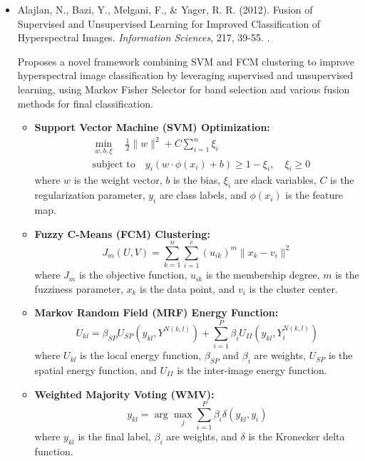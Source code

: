 \documentclass[10pt,svgnames,fragile]{beamer}
\begin{document}
\begin{frame}{}
\tiny
\begin{itemize}

    \item Alajlan, N., Bazi, Y., Melgani, F., \& Yager, R. R. (2012). Fusion of Supervised and Unsupervised Learning for Improved Classification of Hyperspectral Images. \textit{Information Sciences}, 217, 39-55. \href{https://doi.org/10.1016/j.ins.2012.06.031}{\color{blue}{DOI: 10.1016/j.ins.2012.06.031}}. \cite{alajlanFusionSupervisedUnsupervised2012}
    
    {\color{gray}Proposes a novel framework combining SVM and FCM clustering to improve hyperspectral image classification by leveraging supervised and unsupervised learning, using Markov Fisher Selector for band selection and various fusion methods for final classification.}
    \begin{itemize} \tiny
    \item \textbf{Support Vector Machine (SVM) Optimization:}
    \[
    \begin{aligned}
    & \min_{w,b,\xi} \quad \frac{1}{2} \| w \|^2 + C \sum_{i=1}^{n} \xi_i \\
    & \text{subject to} \quad y_i (w \cdot \phi(x_i) + b) \geq 1 - \xi_i, \quad \xi_i \geq 0
    \end{aligned}
    \]
    where \( w \) is the weight vector, \( b \) is the bias, \( \xi_i \) are slack variables, \( C \) is the regularization parameter, \( y_i \) are class labels, and \( \phi(x_i) \) is the feature map.

    \item \textbf{Fuzzy C-Means (FCM) Clustering:}
    \[
    J_m(U,V) = \sum_{k=1}^{n} \sum_{i=1}^{c} (u_{ik})^m \| x_k - v_i \|^2
    \]
    where \( J_m \) is the objective function, \( u_{ik} \) is the membership degree, \( m \) is the fuzziness parameter, \( x_k \) is the data point, and \( v_i \) is the cluster center.

    \item \textbf{Markov Random Field (MRF) Energy Function:}
    \[
    U_{kl} = \beta_{SP} U_{SP}(y_{kl}, Y^{N(k,l)}) + \sum_{i=1}^{P} \beta_i U_{II}(y_{kl}, Y_i^{N(k,l)})
    \]
    where \( U_{kl} \) is the local energy function, \( \beta_{SP} \) and \( \beta_i \) are weights, \( U_{SP} \) is the spatial energy function, and \( U_{II} \) is the inter-image energy function.

    \item \textbf{Weighted Majority Voting (WMV):}
    \[
    y_{kl} = \arg \max_{j} \sum_{i=1}^{P} \beta_i \delta(y_{kl}, y_i)
    \]
    where \( y_{kl} \) is the final label, \( \beta_i \) are weights, and \( \delta \) is the Kronecker delta function.
    \end{itemize}

\end{itemize}
\end{frame}
\end{document}
